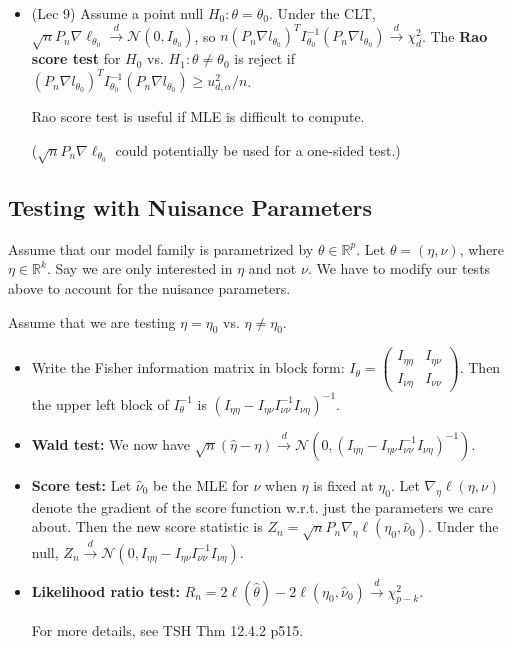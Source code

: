 \documentclass[twoside]{article}
\newcommand\bbR{\mathbb{R}}
\newcommand\calN{\mathcal{N}}
\def\t{\theta}
\newcommand\cd{\stackrel{d}{\goesto}}
\newcommand\goesto{\rightarrow}
\begin{document}
\begin{itemize}
\item (Lec 9) Assume a point null $H_0: \t = \t_0$. Under the CLT, $\sqrt{n} P_n \nabla \ell_{\t_0} \cd \calN(0, I_{\t_0})$, so $n(P_n \nabla l_{\theta_0})^TI_{\theta_0}^{-1}(P_n \nabla l_{\theta_0}) \cd \chi_d^2$. The \textbf{Rao score test} for $H_0$ vs. $H_1: \t \neq \t_0$ is reject if $(P_n \nabla l_{\theta_0})^TI_{\theta_0}^{-1}(P_n \nabla l_{\theta_0}) \geq u^2_{d,\alpha}/n$.

Rao score test is useful if MLE is difficult to compute.

($\sqrt{n} P_n \nabla \ell_{\t_0}$ could potentially be used for a one-sided test.)

\end{itemize}

\subsection{Testing with Nuisance Parameters}
Assume that our model family is parametrized by $\t \in \bbR^p$. Let $\t = (\eta, \nu)$, where $\eta \in \bbR^k$. Say we are only interested in $\eta$ and not $\nu$. We have to modify our tests above to account for the nuisance parameters.

Assume that we are testing $\eta = \eta_0$ vs. $\eta \neq \eta_0$.

\begin{itemize}
\item Write the Fisher information matrix in block form: $I_\t = \begin{pmatrix} I_{\eta\eta} & I_{\eta\nu} \\ I_{\nu\eta} & I_{\nu\nu} \end{pmatrix}$. Then the upper left block of $I_\t^{-1}$ is $(I_{\eta\eta} - I_{\eta\nu}I_{\nu\nu}^{-1}I_{\nu\eta})^{-1}$.

\item \textbf{Wald test:} We now have $\sqrt{n}(\hat{\eta} - \eta) \cd \calN(0, (I_{\eta\eta} - I_{\eta\nu}I_{\nu\nu}^{-1}I_{\nu\eta})^{-1})$.

\item \textbf{Score test:} Let $\hat{\nu}_0$ be the MLE for $\nu$ when $\eta$ is fixed at $\eta_0$. Let $\nabla_\eta \ell(\eta, \nu)$ denote the gradient of the score function w.r.t. just the parameters we care about. Then the new score statistic is $Z_n = \sqrt{n} P_n \nabla_\eta \ell(\eta_0, \hat{\nu}_0)$. Under the null, $Z_n \cd \calN(0, I_{\eta\eta} - I_{\eta\nu}I_{\nu\nu}^{-1}I_{\nu\eta})$.

\item \textbf{Likelihood ratio test:} $R_n = 2 \ell(\hat{\t}) - 2 \ell (\eta_0, \hat{\nu}_0) \cd \chi_{p-k}^2$.

For more details, see TSH Thm 12.4.2 p515.

\end{itemize}
\end{document}

